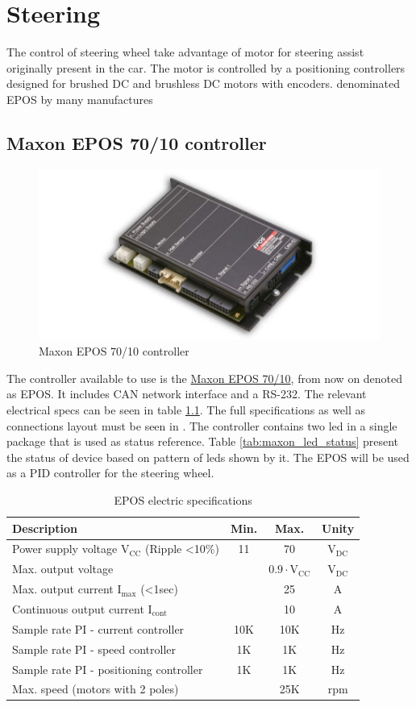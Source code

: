 \chapter{Steering}
The control of steering wheel take advantage of motor for steering assist originally present in the car. The motor is controlled by a positioning controllers designed for brushed DC and brushless DC motors with encoders. denominated \gls{EPOS} by many manufactures

\section{Maxon EPOS 70/10 controller}
\begin{figure}[h]
	\centering
	\includegraphics[width=0.5\linewidth]{figures/EPOS-70-10-10-A-11-70VDC-Detail.jpg}
	\caption{Maxon EPOS 70/10 controller}
	\label{fig:maxon_epos}
\end{figure}
The controller available to use is the \href{https://www.maxonmotor.com/maxon/view/product/control/Positionierung/300583}{Maxon EPOS 70/10}, from now on denoted as EPOS. It includes CAN network interface and a RS-232. The relevant electrical specs can be seen in table \ref{tab:epos_specs}. The full specifications as well as connections layout must be seen in \cite{epos_hardware}. The controller contains two led in a single package that is used as status reference. Table \ref{tab:maxon_led_status} present the status of device based on pattern of leds shown by it.
The \gls{EPOS} will be used as a \gls{PID} controller for the steering wheel.

\begin{table}[hb]
	\centering
	\begin{tabular}{lccc}
		\toprule
		\textbf{Description} & \textbf{Min.} & \textbf{Max.} & \textbf{Unity}\\
		\midrule
		Power supply voltage $\text{V}_\text{CC}$ (Ripple \textless 10\%) & 11 & 70 & $\text{V}_\text{DC}$\\
		Max. output voltage & & $0.9\cdot\text{V}_\text{CC}$ & $\text{V}_\text{DC}$\\
		Max. output current $\text{I}_\text{max}$ (\textless 1sec) &  & 25 & A\\
		Continuous output current $\text{I}_\text{cont}$ & & 10 & A\\
		Sample rate PI - current controller &10K & 10K & Hz\\ 
		Sample rate PI - speed controller  &1K & 1K & Hz\\ 
		Sample rate PI - positioning controller &1K & 1K & Hz\\
		Max. speed (motors with 2 poles) & & 25K & rpm\\
		\bottomrule
	\end{tabular}
    \caption{EPOS electric specifications}
    \label{tab:epos_specs}
\end{table}

